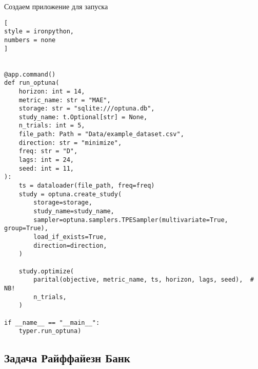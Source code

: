 \documentclass[%
	11pt,
	a4paper,
	utf8,
		]{article}
\begin{document}
Создаем приложение для запуска
\begin{lstlisting}[
style = ironpython,
numbers = none
]


@app.command()
def run_optuna(
    horizon: int = 14,
    metric_name: str = "MAE",
    storage: str = "sqlite:///optuna.db",
    study_name: t.Optional[str] = None,
    n_trials: int = 5,
    file_path: Path = "Data/example_dataset.csv",
    direction: str = "minimize",
    freq: str = "D",
    lags: int = 24,
    seed: int = 11,
):
    ts = dataloader(file_path, freq=freq)
    study = optuna.create_study(
        storage=storage,
        study_name=study_name,
        sampler=optuna.samplers.TPESampler(multivariate=True, group=True),
        load_if_exists=True,
        direction=direction,
    )
    
    study.optimize(
        parital(objective, metric_name, ts, horizon, lags, seed),  # NB!
        n_trials,
    )
    
if __name__ == "__main__":
    typer.run_optuna)
\end{lstlisting}

\subsection{Задача Райффайезн Банк}
\end{document}
